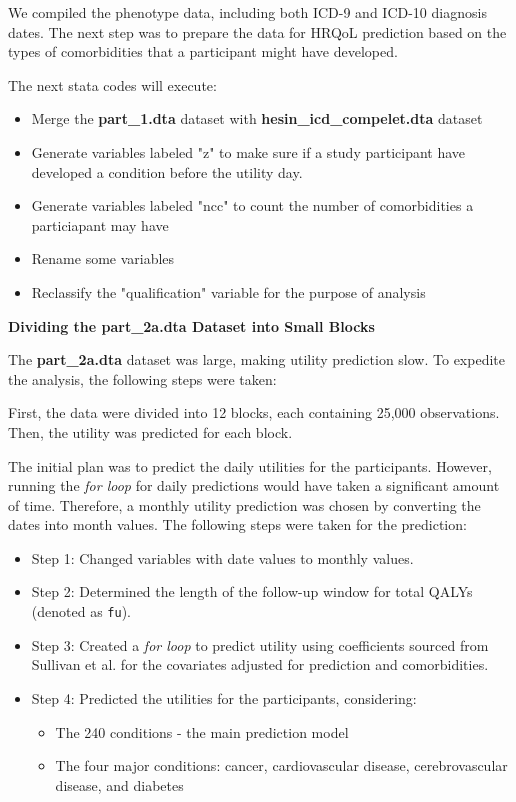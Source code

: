 \documentclass[11pt]{article}
\newcounter{subsubsubsection}[subsubsection]
\begin{document}
We compiled the phenotype data, including both ICD-9 and ICD-10 diagnosis dates. The next step was to prepare the data for HRQoL prediction based on the types of comorbidities that a participant might have developed.

The next stata codes will execute: 

\begin{itemize}
\item{Merge the \textbf{part\_1.dta} dataset with \textbf{hesin\_icd\_compelet.dta} dataset}
\item{Generate variables labeled "z" to make sure if a study participant have developed a condition before the utility day.}
\item{Generate variables labeled "ncc" to count the number of comorbidities a particiapant may have}
\item{Rename some variables}
\item{Reclassify the "qualification" variable for the purpose of analysis}
\end{itemize}
\color{violet}
\begin{stlog}\end{stlog}
\color{black}
\textbf{Dividing the part\_2a.dta Dataset into Small Blocks}

The \textbf{part\_2a.dta} dataset was large, making utility prediction slow. To expedite the analysis, the following steps were taken:

First, the data were divided into 12 blocks, each containing 25,000 observations. Then, the utility was predicted for each block.


The initial plan was to predict the daily utilities for the participants. However, running the \textit{for loop} for daily predictions would have taken a significant amount of time. Therefore, a monthly utility prediction was chosen by converting the dates into month values. The following steps were taken for the prediction:

\begin{itemize}
\item{Step 1: Changed variables with date values to monthly values.}
\item{Step 2: Determined the length of the follow-up window for total QALYs (denoted as \texttt{fu}).}
\item{Step 3: Created a \textit{for loop} to predict utility using coefficients sourced from Sullivan et al.\cite{sullivan2011catalogue} for the covariates adjusted for prediction and comorbidities.}
\item{Step 4: Predicted the utilities for the participants, considering:}
	\begin{itemize}
		\item{The 240 conditions - the main prediction model}
		\item{The four major conditions: cancer, cardiovascular disease, cerebrovascular disease, and diabetes}
	\end{itemize}
\end{itemize}
\end{document}
